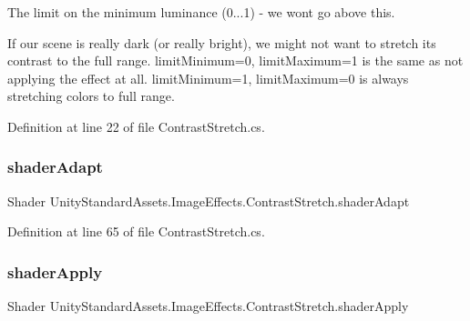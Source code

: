 The limit on the minimum luminance (0...1) -\/ we won\textquotesingle{}t go above this. 

If our scene is really dark (or really bright), we might not want to stretch its contrast to the full range. limit\+Minimum=0, limit\+Maximum=1 is the same as not applying the effect at all. limit\+Minimum=1, limit\+Maximum=0 is always stretching colors to full range. 

Definition at line 22 of file Contrast\+Stretch.\+cs.

\mbox{\label{class_unity_standard_assets_1_1_image_effects_1_1_contrast_stretch_ac01688755bbb7059ba53739dd823d3f7}} 
\subsubsection{\texorpdfstring{shader\+Adapt}{shaderAdapt}}
{\footnotesize\ttfamily Shader Unity\+Standard\+Assets.\+Image\+Effects.\+Contrast\+Stretch.\+shader\+Adapt}



Definition at line 65 of file Contrast\+Stretch.\+cs.

\mbox{\label{class_unity_standard_assets_1_1_image_effects_1_1_contrast_stretch_acd9e4e3bae17bf9471c9cc8350c5e162}} 
\subsubsection{\texorpdfstring{shader\+Apply}{shaderApply}}
{\footnotesize\ttfamily Shader Unity\+Standard\+Assets.\+Image\+Effects.\+Contrast\+Stretch.\+shader\+Apply}



